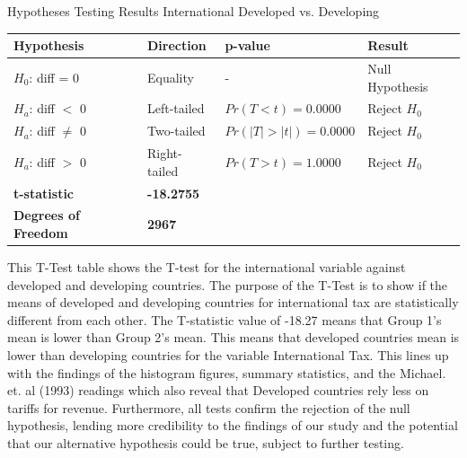 \documentclass[12pt]{article}
\begin{document}
\centering
\caption{Hypotheses Testing Results International Developed vs. Developing}
\label{tab:hypothesis_test}
\renewcommand{\arraystretch}{1.2} %
\begin{tabular}{|l|l|l|l|}
\hline
\textbf{Hypothesis}          & \textbf{Direction} & \textbf{p-value}      & \textbf{Result}       \\ \hline
$H_0$: diff = 0              & Equality           & -                     & Null Hypothesis       \\ \hline
$H_a$: diff $<$ 0            & Left-tailed        & $Pr(T < t) = 0.0000$  & Reject $H_0$          \\ \hline
$H_a$: diff $\neq$ 0         & Two-tailed         & $Pr(|T| > |t|) = 0.0000$ & Reject $H_0$       \\ \hline
$H_a$: diff $>$ 0            & Right-tailed       & $Pr(T > t) = 1.0000$  & Reject $H_0$          \\ \hline
\textbf{t-statistic}         & \textbf{-18.2755}  &                       &                       \\ \hline
\textbf{Degrees of Freedom}  & \textbf{2967}      &                       &                       \\ \hline
\end{tabular}

\bigskip

This T-Test table shows the T-test for the international variable against developed and developing countries. The purpose of the T-Test is to show if the means of developed and developing countries for international tax are statistically different from each other. The T-statistic value of -18.27 means that Group 1's mean is lower than Group 2's mean. This means that developed countries mean is lower than developing countries for the variable International Tax. This lines up with the findings of the histogram figures, summary statistics, and the  Michael. et. al (1993) readings which also reveal that Developed countries rely less on tariffs for revenue. Furthermore, all tests confirm the rejection of the null hypothesis, lending more credibility to the findings of our study and the potential that our alternative hypothesis could be true, subject to further testing. 
\end{document}
